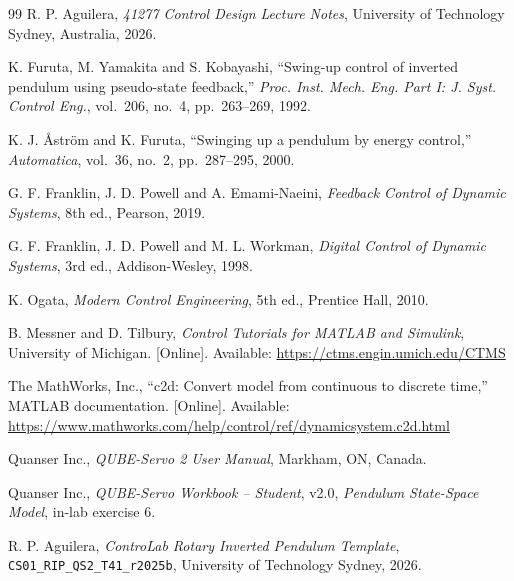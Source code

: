 \documentclass[11pt,a4paper]{article}
\begin{document}
\begin{thebibliography}{99}
R. P. Aguilera, \emph{41277 Control Design Lecture Notes}, University of
Technology Sydney, Australia, 2026.

K. Furuta, M. Yamakita and S. Kobayashi, ``Swing-up control of inverted
pendulum using pseudo-state feedback,'' \emph{Proc. Inst. Mech. Eng. Part
I: J. Syst. Control Eng.}, vol.~206, no.~4, pp.~263--269, 1992.

K. J. Åström and K. Furuta, ``Swinging up a pendulum by energy control,''
\emph{Automatica}, vol.~36, no.~2, pp.~287--295, 2000.

G. F. Franklin, J. D. Powell and A. Emami-Naeini, \emph{Feedback Control of
Dynamic Systems}, 8th ed., Pearson, 2019.

G. F. Franklin, J. D. Powell and M. L. Workman, \emph{Digital Control of
Dynamic Systems}, 3rd ed., Addison-Wesley, 1998.

K. Ogata, \emph{Modern Control Engineering}, 5th ed., Prentice Hall, 2010.

B. Messner and D. Tilbury, \emph{Control Tutorials for MATLAB and
Simulink}, University of Michigan. [Online]. Available:
\url{https://ctms.engin.umich.edu/CTMS}

The MathWorks, Inc., ``c2d: Convert model from continuous to discrete
time,'' MATLAB documentation. [Online]. Available:
\url{https://www.mathworks.com/help/control/ref/dynamicsystem.c2d.html}

Quanser Inc., \emph{QUBE-Servo 2 User Manual}, Markham, ON, Canada.

Quanser Inc., \emph{QUBE-Servo Workbook -- Student}, v2.0,
\emph{Pendulum State-Space Model}, in-lab exercise 6.

R. P. Aguilera, \emph{ControLab Rotary Inverted Pendulum Template},
\texttt{CS01\_RIP\_QS2\_T41\_r2025b}, University of Technology Sydney, 2026.
\end{thebibliography}
\end{document}
